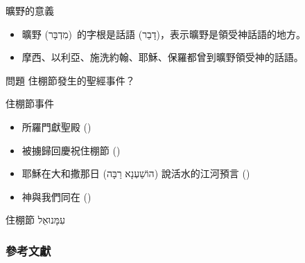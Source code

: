 \documentclass{beamer}
\newcommand{\question}[1]{
  \begin{frame}{問題}
    \centering
    \vspace*{1cm}
    \huge #1？\par
    \vfill
  \end{frame}
}
\newcommand{\conclusion}[2]{
  \begin{frame}
    \centering
    \vspace*{1cm}
    {\fontsize{40}{48}\selectfont #1 \textemdash #2\par}
    \vfill
  \end{frame}
}
\begin{document}
\begin{frame}{曠野的意義}
  \begin{itemize}
    \item 曠野 (\texthebrew{מִדְבָּר})\ 的字根是話語 (\texthebrew{דָבַר})，表示曠野是領受神話語的地方。
    \item 摩西、以利亞、施洗約翰、耶穌、保羅都曾到曠野領受神的話語。
  \end{itemize}
\end{frame}

\question{住棚節發生的聖經事件}

\begin{frame}{住棚節事件}
  \begin{itemize}
    \item 所羅門獻聖殿 ()
    \item 被擄歸回慶祝住棚節 ()
    \item 耶穌在大和撒那日 (\texthebrew{הוֹשַׁעְנָא רַבָּה}) 說活水的江河預言 ()\parencite{YeshuaInSukkot, 大和撒那日}
    \item 神與我們同在 ()
  \end{itemize}
\end{frame}

\conclusion{住棚節}{\texthebrew{עִמָּנוּאֵל}}

\begin{frame}[allowframebreaks]
  \frametitle{參考文獻}
  \printbibliography
\end{frame}
\end{document}

